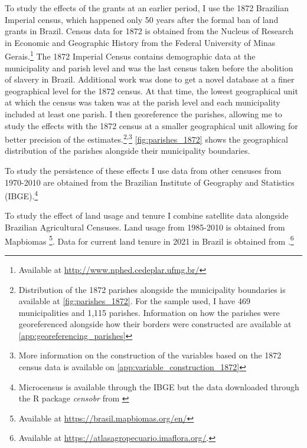 \documentclass{article}
\begin{document}
To study the effects of the grants at an earlier period, I use the 1872 Brazilian Imperial census, which happened only 50 years after the formal ban of land grants in Brazil.
Census data for 1872 is obtained from the Nucleus of Research in Economic and Geographic History from the Federal University of Minas Gerais.\footnote{
  Available at \url{http://www.nphed.cedeplar.ufmg.br/}}
The 1872 Imperial Census contains demographic data at the municipality and parish level and was the last census taken before the abolition of slavery in Brazil. 
Additional work was done to get a novel database at a finer geographical level for the 1872 census.
At that time, the lowest geographical unit at which the census was taken was at the parish level and each municipality included at least one parish.
I then georeference the parishes, allowing me to study the effects with the 1872 census at a smaller geographical unit allowing for better precision of the estimates.\footnote{Distribution of the 1872 parishes alongside the municipality boundaries is available at \autoref{fig:parishes_1872}. For the sample used, I have 469 municipalities and 1,115 parishes. Information on how the parishes were georeferenced alongside how their borders were constructed are available at \autoref{app:georeferencing_parishes}}\textsuperscript{,}\footnote{More information on the construction of the variables based on the 1872 census data is available on \autoref{app:variable_construction_1872}} 
\autoref{fig:parishes_1872} shows the geographical distribution of the parishes alongside their municipality boundaries. 

To study the persistence of these effects I use data from other censuses from 1970-2010 are obtained from the Brazilian Institute of Geography and Statistics (IBGE).\footnote{Microcensus is available through the IBGE but the data downloaded through the R package \textit{censobr} from \textcite{Pereira2023-qv}}

To study the effect of land usage and tenure I combine satellite data alongside Brazilian Agricultural Censuses. 
Land usage from 1985-2010 is obtained from Mapbiomas \parencite{Souza2020-kb}\footnote{
  Available at \url{https://brasil.mapbiomas.org/en/}}.
Data for current land tenure in 2021 in Brazil is obtained from \textcite{Sparovek2019-dn}.\footnote{
  Available at \url{https://atlasagropecuario.imaflora.org/}.}
\end{document}
